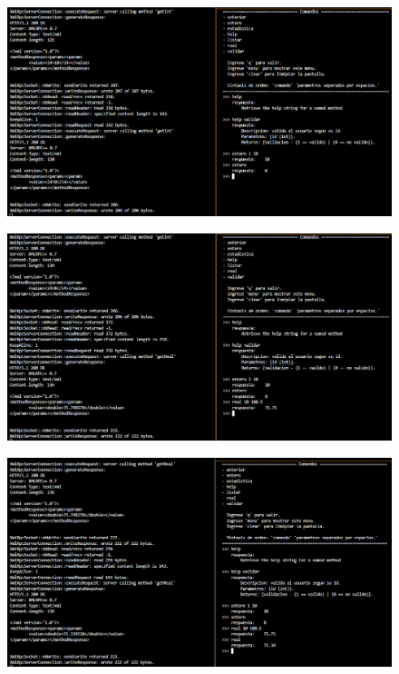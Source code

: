 \documentclass[a4paper,12pt]{article}
\begin{document}
\begin{figure}[htbp]
    \begin{adjustbox}{max width=\textwidth, center}
        \includegraphics{C5/Servidor_cliente_6.PNG}
    \end{adjustbox}
\end{figure}
\begin{figure}[htbp]
    \begin{adjustbox}{max width=\textwidth, center}
        \includegraphics{C5/Servidor_cliente_7.PNG}
    \end{adjustbox}
\end{figure}
\begin{figure}[htbp]
    \begin{adjustbox}{max width=\textwidth, center}
        \includegraphics{C5/Servidor_cliente_8.PNG}
    \end{adjustbox}
\end{figure}
\end{document}
